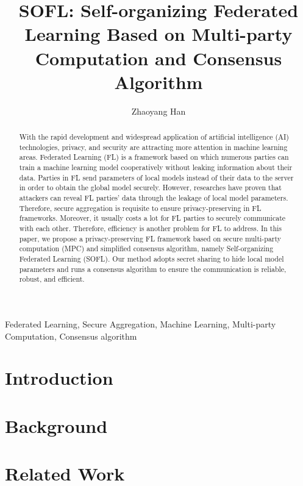 \documentclass[journal]{IEEEtran}
\title {SOFL: Self-organizing Federated Learning Based on Multi-party Computation and Consensus Algorithm}
\author{Zhaoyang Han}
\begin{document}
\maketitle

\begin{abstract}
With the rapid development and widespread application of artificial intelligence (AI) technologies, privacy, and security are attracting more attention in machine learning areas. Federated Learning (FL) is a framework based on which numerous parties can train a machine learning model cooperatively without leaking information about their data. Parties in FL send parameters of local models instead of their data to the server in order to obtain the global model securely. However, researches have proven that attackers can reveal FL parties' data through the leakage of local model parameters. Therefore, secure aggregation is requisite to ensure privacy-preserving in FL frameworks. Moreover, it usually costs a lot for FL parties to securely communicate with each other. Therefore, efficiency is another problem for FL to address. In this paper, we propose a privacy-preserving FL framework based on secure multi-party computation (MPC) and simplified consensus algorithm, namely Self-organizing Federated Learning (SOFL). Our method adopts secret sharing to hide local model parameters and runs a consensus algorithm to ensure the communication is reliable, robust, and efficient.

\end{abstract}

\begin{IEEEkeywords}
    Federated Learning, Secure Aggregation, Machine Learning, Multi-party Computation, Consensus algorithm
\end{IEEEkeywords}


\section{Introduction} 
\label{sec:intro}


\section{Background}
\label{sec:back}


\section{Related Work}
\label{sec:related}

\end{document}
